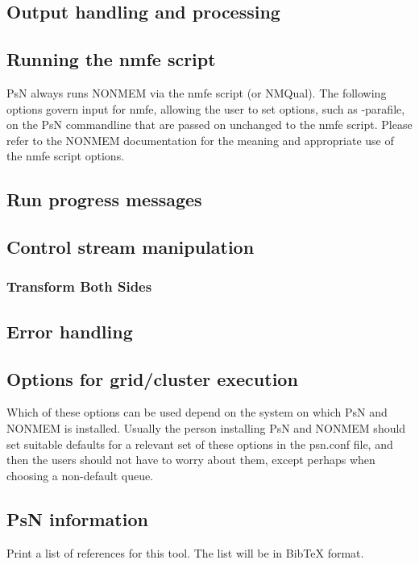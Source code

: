 \subsection{Output handling and processing}


\subsection{Running the nmfe script}
PsN always runs NONMEM via the nmfe script (or NMQual). 
The following options govern input for
nmfe, allowing the user to set options, such as -parafile, on the PsN commandline that
are passed on unchanged to the nmfe script.
Please refer to the NONMEM documentation for the meaning and appropriate use
of the nmfe script options.


\subsection{Run progress messages}


\subsection{Control stream manipulation}

\subsubsection{Transform Both Sides}



\subsection{Error handling}



\subsection{Options for grid/cluster execution}
Which of these options can be used depend on the system on which PsN and NONMEM is installed.
Usually the person installing PsN and NONMEM should set suitable defaults for a relevant set
of these
options in the psn.conf file, and then the users should not have to worry about them,
except perhaps when choosing a non-default queue.


\subsection{PsN information}
\begin{optionlist}
Print a list of references for this tool. The list will be in BibTeX format.
\nextopt
\end{optionlist}



